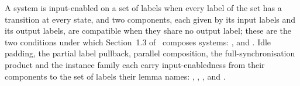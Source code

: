 \begin{definition}
  \label{def:input-enabledness}
  \leanok
  A system is input-enabled on a set of labels when every label of the set has a transition at every state, and two components, each given by its input labels and its output labels, are compatible when they share no output label; these are the two conditions under which Section~1.3 of~\cite{LeslieBP} composes systems: ,  and .
  Idle padding, the partial label pullback, parallel composition, the full-synchronisation product and the instance family each carry input-enabledness from their components to the set of labels their lemma names: , , ,  and .
\end{definition}
